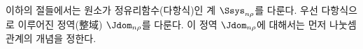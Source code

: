 
이하의 절들에서는 원소가 정유리함수(다항식)인 계 $\Ssys_{n\rho}$를 다룬다. 우선 다항식으로 이루어진 정역(整域) $\Jdom_{n\rho}$를 다룬다. 이 정역 $\Jdom_{n\rho}$에 대해서는 먼저 나눗셈 관계의 개념을 정한다.
